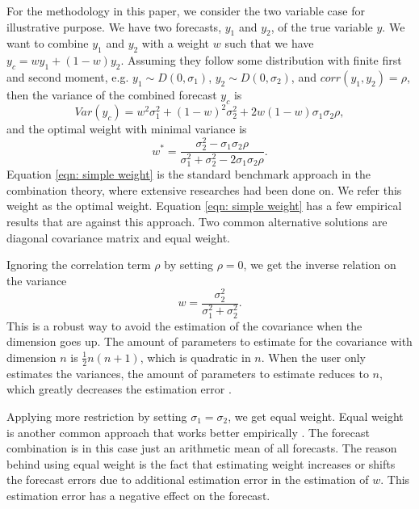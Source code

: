 \documentclass[11pt]{article}
\begin{document}
For the methodology in this paper, we consider the two variable case for illustrative purpose. We have
two forecasts, \(y_1\) and \(y_2\), of the true variable \(y\). We want
to combine \(y_1\) and \(y_2\) with a weight \(w\) such that we have
\(y_c = w y_1 + (1-w) y_2\). Assuming they follow some distribution with finite first and second moment, e.g.
\(y_1 \sim D(0,\sigma_1)\), \(y_2 \sim D(0,\sigma_2)\), and
\(corr(y_1,y_2)=\rho\), then the variance of the combined forecast
\(y_c\) is
\begin{equation}
\label{eqn: var yc}
Var(y_c) = w^2\sigma_1^2+ (1-w)^2\sigma_2^2+2w(1-w)\sigma_1\sigma_2\rho,
\end{equation}
and the optimal weight with minimal variance is
\begin{equation}
\label{eqn: simple weight}
w^*=\frac{\sigma_2^2-\sigma_1\sigma_2\rho}{\sigma_1^2+\sigma_2^2 -2\sigma_1\sigma_2\rho}.
\end{equation}
Equation \ref{eqn: simple weight} is the standard benchmark approach in
the combination theory, where extensive researches had been done on. We refer this weight as the optimal weight. Equation \ref{eqn: simple weight} has a few
empirical results that are against this approach. Two common
alternative solutions are diagonal covariance matrix and equal weight.

Ignoring the correlation term \(\rho\) by setting \(\rho=0\), we get the
inverse relation on the variance
\begin{equation}
\label{eqn: simple weight no corr}
w=\frac{\sigma_2^2}{\sigma_1^2+\sigma_2^2}.
\end{equation}
This is a robust way to avoid the estimation of the covariance when the
dimension goes up. The amount of parameters to estimate for the
covariance with dimension \(n\) is \(\frac{1}{2}n(n+1)\), which is
quadratic in \(n\). When the user only estimates the variances, the
amount of parameters to estimate reduces to \(n\), which greatly
decreases the estimation error \citep{Stock2001}.

Applying more restriction by setting $\sigma_1=\sigma_2$, we get equal weight. Equal weight is another common approach that works better empirically \citep{Clemen1989}. The forecast combination is in this case just an
arithmetic mean of all forecasts. The reason behind using equal weight is the fact
that estimating weight increases or shifts the forecast errors due to
additional estimation error in the estimation of \(w\). This estimation error has a negative effect on the forecast.
\end{document}
